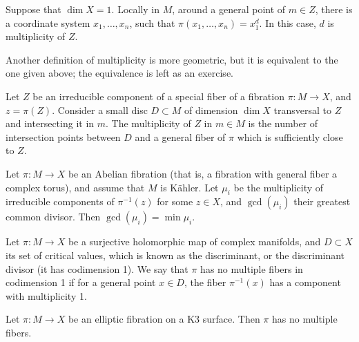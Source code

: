 \begin{remark}
\label{remark-multiplicity-one-dimensional}
Suppose that \(\dim X=1\). Locally in \(M\),
around a general point of \(m \in Z\), there
is a coordinate system \(x_1,\ldots,x_n\),
such that \(\pi(x_1,\ldots,x_n)=x_1^d\).
In this case, \(d\) is multiplicity of
\(Z\).
\end{remark}

\begin{remark}
\label{remark-equivalent-definition}
Another definition of multiplicity is more
geometric, but it is equivalent to the one
given above; the equivalence is left as an
exercise.
\end{remark}

\begin{definition}
\label{definition-multiplicity-transversal-disk}
Let \(Z\) be an irreducible component of a
special fiber of a fibration
\(\pi : M \to X\), and \(z=\pi(Z)\).
Consider a small disc \(D \subset M\) of
dimension \(\dim X\) transversal to \(Z\)
and intersecting it in \(m\). The
multiplicity of \(Z\) in \(m \in M\) is the
number of intersection points between \(D\)
and a general fiber of \(\pi\) which is
sufficiently close to \(Z\).
\end{definition}

\begin{theorem}
\label{theorem-campana-kamenova-verbitsky}
Let \(\pi : M \to X\) be an Abelian
fibration (that is, a fibration with general
fiber a complex torus), and assume that
\(M\) is K\"ahler. Let \(\mu_i\) be the
multiplicity of irreducible components of
\(\pi^{-1}(z)\) for some \(z \in X\), and
\(\gcd(\mu_i)\) their greatest common
divisor. Then \(\gcd(\mu_i)=\min \mu_i\).
\end{theorem}

\begin{definition}
\label{definition-discriminant}
Let \(\pi : M \to X\) be a surjective
holomorphic map of complex manifolds, and
\(D \subset X\) its set of critical values,
which is known as the discriminant, or the
discriminant divisor (it has codimension
1). We say that \(\pi\) has no multiple
fibers in codimension 1 if for a general
point \(x \in D\), the fiber \(\pi^{-1}(x)\)
has a component with multiplicity 1.
\end{definition}

\begin{theorem}
\label{theorem-elliptic-k3-no-multiple-fibers}
Let \(\pi : M \to X\) be an elliptic
fibration on a K3 surface. Then \(\pi\) has
no multiple fibers.
\end{theorem}

